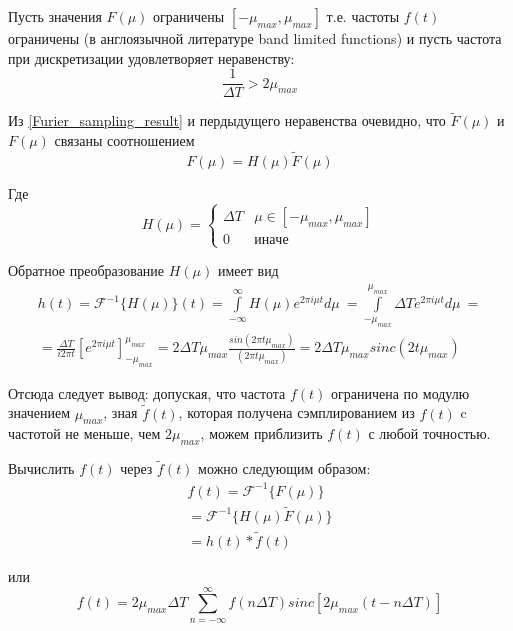 \documentclass[oneside,final,14pt]{extreport}
\begin{document}
Пусть значения $F(\mu)$  ограничены $[-\mu_{max},\mu_{max} ] $ т.е. частоты $f(t)$ ограничены  (в англоязычной литературе band limited functions) и 
пусть частота при дискретизации удовлетворяет неравенству:
\begin{equation}
\frac{1}{\varDelta T} 
>
2\mu_{max}
\end{equation}

Из \ref{Furier_sampling_result} и пердыдущего неравенства очевидно, что $\tilde{F}(\mu)$ и $F(\mu)$ связаны соотношением
\begin{equation}
F(\mu)
=
H(\mu)
\tilde{F}(\mu)
\end{equation}

Где 
\begin{equation}
H(\mu)
=
\begin{cases}
\varDelta T & 
\mu \in [-\mu_{max},\mu_{max}] \\
0 & иначе
\end{cases}
\end{equation}

Обратное преобразование $H(\mu)$ имеет вид
\begin{gather*}
h(t)
=
\mathcal{F}^{-1}\{H(\mu)\}(t)
=
\int\limits_{-\infty}^{\infty}
H(\mu)
e^{2\pi i \mu t }
d\mu~
=
\int\limits_{-\mu_{max}}^{\mu_{max}}
\varDelta T
e^{2\pi i \mu t }
d\mu~
=
\\
=
\frac{\varDelta T}
{i 2 \pi t} 
\left[
e^{	2\pi i \mu t }
\right]_{-\mu_{max}}^{\mu_{max}}
=
2\varDelta T \mu_{max}
\frac{sin(2\pi t \mu_{max}) }{(2\pi t \mu_{max})}
=
2\varDelta T \mu_{max}
sinc(2t\mu_{max})
\end{gather*}

Отсюда следует вывод:  допуская, что частота $f(t)$ ограничена по модулю значением $\mu_{max}$, зная $\tilde{f}(t)$, которая получена сэмплированием из $f(t)$ c частотой не меньше, чем $2 \mu_{max}$,  можем приблизить $f(t)$ с любой точностью. 

Вычислить $f(t)$ через $\tilde{f}(t)$ можно следующим образом:
\begin{gather*}
f(t)
=
\mathcal{F}^{-1}
\{ F(\mu) \}
\\
=
\mathcal{F}^{-1}
\{
H(\mu)\tilde{F}(\mu)
\}
\\
=
h(t)*\tilde{f}(t)
\end{gather*}

или 
\begin{equation}
f(t) 
=
2  \mu_{max} \varDelta T
\sum_{ n = - \infty}^{\infty}
f(n \varDelta T ) 
sinc[ 2  \mu_{max}  (t - n \varDelta T) 	]
\end{equation}
\end{document}
